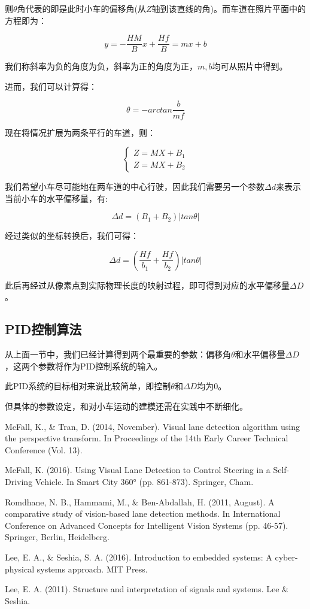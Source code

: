 \documentclass[11pt]{article}
\begin{document}
则$\theta$角代表的即是此时小车的偏移角(从$Z$轴到该直线的角)。而车道在照片平面中的方程即为：

$$
y = -\frac{HM}{B}x + \frac{Hf}{B} = mx + b
$$

我们称斜率为负的角度为负，斜率为正的角度为正，$m, b$均可从照片中得到。

进而，我们可以计算得：

$$
\theta = -arctan\frac{b}{mf}
$$

现在将情况扩展为两条平行的车道，则：

$$
\begin{cases}
Z = MX + B_1 \\
Z = MX + B_2
\end{cases}
$$

我们希望小车尽可能地在两车道的中心行驶，因此我们需要另一个参数$\Delta d$来表示当前小车的水平偏移量，有:

$$
\Delta d = (B_1 + B_2) \vert tan\theta \vert
$$

经过类似的坐标转换后，我们可得：

$$
\Delta d = (\frac{Hf}{b_1} + \frac{Hf}{b_2})\vert tan\theta \vert
$$

此后再经过从像素点到实际物理长度的映射过程，即可得到对应的水平偏移量$\Delta D$。

\subsection{PID控制算法}

从上面一节中，我们已经计算得到两个最重要的参数：偏移角$\theta$和水平偏移量$\Delta D$，这两个参数将作为PID控制系统的输入。

此PID系统的目标相对来说比较简单，即控制$\theta$和$\Delta D$均为0。

但具体的参数设定，和对小车运动的建模还需在实践中不断细化。

\newpage

\begin{thebibliography}{99}

 McFall, K., \& Tran, D. (2014, November). Visual lane detection algorithm using the perspective transform. In Proceedings of the 14th Early Career Technical Conference (Vol. 13).

 McFall, K. (2016). Using Visual Lane Detection to Control Steering in a Self-Driving Vehicle. In Smart City 360° (pp. 861-873). Springer, Cham.

 Romdhane, N. B., Hammami, M., \& Ben-Abdallah, H. (2011, August). A comparative study of vision-based lane detection methods. In International Conference on Advanced Concepts for Intelligent Vision Systems (pp. 46-57). Springer, Berlin, Heidelberg.

 Lee, E. A., \& Seshia, S. A. (2016). Introduction to embedded systems: A cyber-physical systems approach. MIT Press.

 Lee, E. A. (2011). Structure and interpretation of signals and systems. Lee \& Seshia. 

\end{thebibliography}
\end{document}
